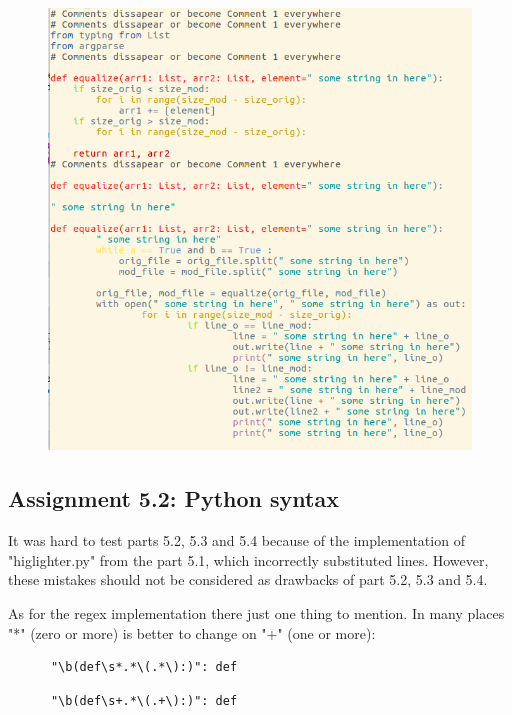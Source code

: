 \documentclass[a4paper]{article}
\begin{document}
\begin{figure}
  \includegraphics[scale=0.5]{feedback.png}
\end{figure}


\subsection*{Assignment 5.2:  Python syntax} \label{sec:assignment5.2}

It was hard to test parts 5.2, 5.3 and 5.4 because of the implementation of "higlighter.py" from the part 5.1, which incorrectly substituted lines. However, these mistakes should not be considered as drawbacks of part 5.2, 5.3 and 5.4.

As for the regex implementation there just one thing to mention. 
In many places "*" (zero or more) is better to change on "+" (one or more):

\begin{verbatim}
      "\b(def\s*.*\(.*\):)": def
\end{verbatim}

\begin{verbatim}
      "\b(def\s+.*\(.+\):)": def
\end{verbatim}
\end{document}
